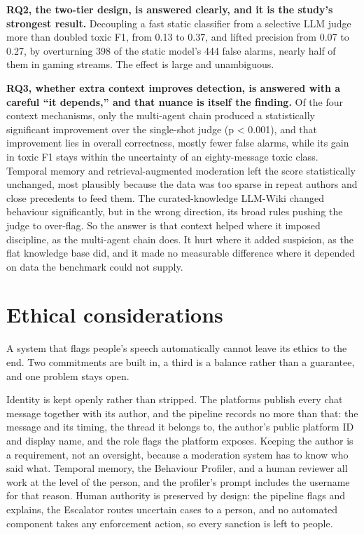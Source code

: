 \textbf{RQ2, the two-tier design, is answered clearly, and it is the study's strongest result.} Decoupling a fast static classifier from a selective LLM judge more than doubled toxic F1, from 0.13 to 0.37, and lifted precision from 0.07 to 0.27, by overturning 398 of the static model's 444 false alarms, nearly half of them in gaming streams. The effect is large and unambiguous.

\textbf{RQ3, whether extra context improves detection, is answered with a careful ``it depends,'' and that nuance is itself the finding.} Of the four context mechanisms, only the multi-agent chain produced a statistically significant improvement over the single-shot judge (p \textless{} 0.001), and that improvement lies in overall correctness, mostly fewer false alarms, while its gain in toxic F1 stays within the uncertainty of an eighty-message toxic class. Temporal memory and retrieval-augmented moderation left the score statistically unchanged, most plausibly because the data was too sparse in repeat authors and close precedents to feed them. The curated-knowledge LLM-Wiki changed behaviour significantly, but in the wrong direction, its broad rules pushing the judge to over-flag. So the answer is that context helped where it imposed discipline, as the multi-agent chain does. It hurt where it added suspicion, as the flat knowledge base did, and it made no measurable difference where it depended on data the benchmark could not supply.

\section{Ethical considerations}\label{ethical-considerations}

A system that flags people's speech automatically cannot leave its ethics to the end. Two commitments are built in, a third is a balance rather than a guarantee, and one problem stays open.

Identity is kept openly rather than stripped. The platforms publish every chat message together with its author, and the pipeline records no more than that: the message and its timing, the thread it belongs to, the author's public platform ID and display name, and the role flags the platform exposes. Keeping the author is a requirement, not an oversight, because a moderation system has to know who said what. Temporal memory, the Behaviour Profiler, and a human reviewer all work at the level of the person, and the profiler's prompt includes the username for that reason. Human authority is preserved by design: the pipeline flags and explains, the Escalator routes uncertain cases to a person, and no automated component takes any enforcement action, so every sanction is left to people.

